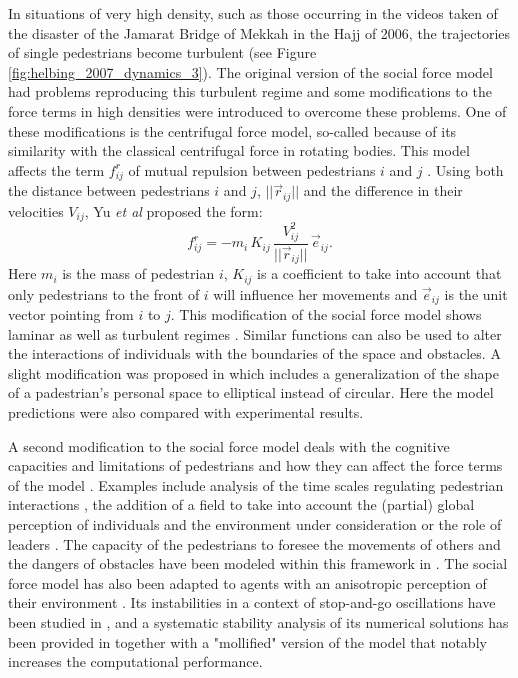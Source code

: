 In situations of very high density, such as those occurring in the videos taken of the disaster of the Jamarat Bridge of Mekkah in the Hajj of 2006, the trajectories of single pedestrians become turbulent \cite{helbing_2007_dynamics,johansson_2008_crowd} (see Figure \ref{fig:helbing_2007_dynamics_3}). The original version of the social force model had problems reproducing this turbulent regime and some modifications to the force terms in high densities were introduced to overcome these problems. One of these modifications is the centrifugal force model, so-called because of its similarity with the classical centrifugal force in rotating bodies. This model affects the term $ f_{ij}^r $ of mutual repulsion between pedestrians $i$ and $j$ \cite{yu_2005_centrifugal,yu_2007_modeling}. Using both the distance between pedestrians $i$ and $j$, $||\vec{r}_{ij}||$ and the difference in their velocities $V_{ij}$, Yu {\it et al} proposed the form:
\begin{equation}
f_{ij}^r  =  -m_i \, K_{ij} \, \frac{V_{ij}^2}{||\vec{r}_{ij}||} \, \vec{e}_{ij}. 
\end{equation}
Here $m_i$ is the mass of pedestrian $i$, $K_{ij}$ is a coefficient to take into account that only pedestrians to the front of $i$ will influence her movements and $\vec{e}_{ij}$ is the unit vector pointing from $i$ to $j$. This modification of the social force model shows laminar as well as turbulent regimes \cite{yu_2007_modeling}. Similar functions can also be used to alter the interactions of individuals with the boundaries of the space and obstacles. A slight modification was proposed in \cite{chraibi_2010_generalized} which includes a generalization of the shape of a padestrian's personal space to elliptical instead of circular. Here the model predictions were also compared with experimental results. 

A second modification to the social force model deals with the cognitive capacities and limitations of pedestrians and how they can affect the force terms of the model \cite{moussaid_2009_experimental,moussaid_2011_how}. 
%
Examples include analysis of the time scales regulating pedestrian interactions \cite{johansson_2009_constant}, the addition of a field to take into account the (partial) global perception of individuals and the environment under consideration \cite{dietrich_2014_gradient,colombi_2015_moving} or the role of leaders \cite{degond_2015_time}. 
%
The capacity of the pedestrians to foresee the movements of others and the dangers of obstacles have been modeled within this framework in \cite{moussaid_2009_experimental,steffen_2009_modification}. 
%
The social force model has also been adapted to agents with an anisotropic perception of their environment \cite{gulikers_2013_effect}. Its instabilities in a context of stop-and-go oscillations have been studied in \cite{chraibi_2014_oscillating,chraibi_2015_jamming}, and a systematic stability analysis of its numerical solutions has been provided in \cite{koster_2013_avoiding} together with a "mollified" version of the model that notably increases the computational performance. 


